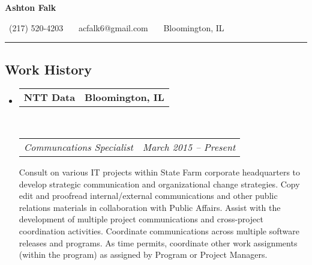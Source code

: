 \documentclass[10pt,letterpaper]{article}
\makeatletter
\newcommand{\headerrow}[2]
{\begin{tabular*}{\linewidth}{l@{\extracolsep{\fill}}r}
	#1 &
	#2 \\
\end{tabular*}}
\makeatother
\begin{document}
\begin{center}
{\LARGE \textbf{Ashton Falk}}

\ (217) 520-4203 \ \textbullet \ \ acfalk6@gmail.com \ \textbullet \ \ Bloomington, IL
\end{center}

\hrule
\vspace{-0.4em}
\subsection*{Work History}

\begin{itemize}
	\parskip=0.1em

	\item
	\headerrow
		{\textbf{NTT Data}}
		{\textbf{Bloomington, IL}}
	\\
	\headerrow
		{\emph{Communcations Specialist}}
		{\emph{March 2015 -- Present}}
        Consult on various IT projects within State Farm corporate headquarters to develop strategic communication and
        organizational change strategies. Copy edit and proofread internal/external communications and other public
        relations materials in collaboration with Public Affairs. Assist with the development of multiple project 
        communications and cross-project coordination activities. Coordinate communications across multiple software
        releases and programs. As time permits, coordinate other work assignments (within the program) as assigned by
        Program or Project Managers.


\end{itemize}
\end{document}
